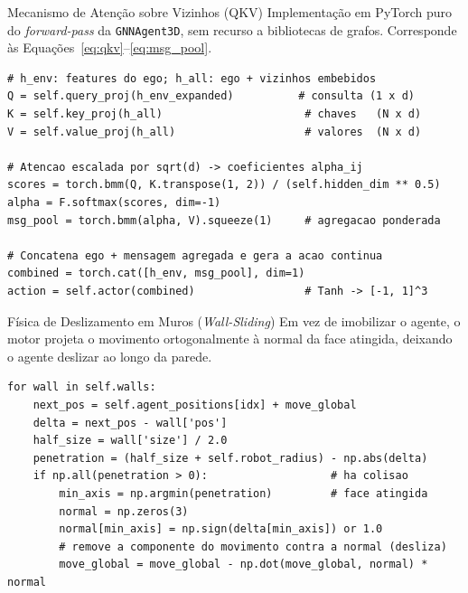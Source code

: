 \documentclass[12pt,reqno, twoside]{amsbook}
\makeatletter
\def\section{\@startsection{section}{1}%
      \z@{.5\linespacing\@plus.7\linespacing}{.25\linespacing}%
      {\normalfont\bfseries\flushleft}}
\theoremstyle{plain}
\numberwithin{equation}{chapter}
\numberwithin{section}{chapter}
\numberwithin{table}{chapter}
\numberwithin{figure}{chapter}
\makeatother
\begin{document}
\section{Mecanismo de Atenção sobre Vizinhos (QKV)}
Implementação em PyTorch puro do \textit{forward-pass} da \texttt{GNNAgent3D}, sem recurso a bibliotecas de grafos. Corresponde às Equações~\ref{eq:qkv}--\ref{eq:msg_pool}.
\begin{lstlisting}[style=python, caption={Atenção de produto interno escalado sobre a vizinhan\c{c}a.}]
# h_env: features do ego; h_all: ego + vizinhos embebidos
Q = self.query_proj(h_env_expanded)          # consulta (1 x d)
K = self.key_proj(h_all)                      # chaves   (N x d)
V = self.value_proj(h_all)                    # valores  (N x d)

# Atencao escalada por sqrt(d) -> coeficientes alpha_ij
scores = torch.bmm(Q, K.transpose(1, 2)) / (self.hidden_dim ** 0.5)
alpha = F.softmax(scores, dim=-1)
msg_pool = torch.bmm(alpha, V).squeeze(1)     # agregacao ponderada

# Concatena ego + mensagem agregada e gera a acao continua
combined = torch.cat([h_env, msg_pool], dim=1)
action = self.actor(combined)                 # Tanh -> [-1, 1]^3
\end{lstlisting}

\section{Física de Deslizamento em Muros (\textit{Wall-Sliding})}
Em vez de imobilizar o agente, o motor projeta o movimento ortogonalmente à normal da face atingida, deixando o agente deslizar ao longo da parede.
\begin{lstlisting}[style=python, float=!htbp, caption={Proje\c{c}\~ao ortogonal do movimento contra a normal do muro.}]
for wall in self.walls:
    next_pos = self.agent_positions[idx] + move_global
    delta = next_pos - wall['pos']
    half_size = wall['size'] / 2.0
    penetration = (half_size + self.robot_radius) - np.abs(delta)
    if np.all(penetration > 0):                   # ha colisao
        min_axis = np.argmin(penetration)         # face atingida
        normal = np.zeros(3)
        normal[min_axis] = np.sign(delta[min_axis]) or 1.0
        # remove a componente do movimento contra a normal (desliza)
        move_global = move_global - np.dot(move_global, normal) * normal
\end{lstlisting}
\end{document}
